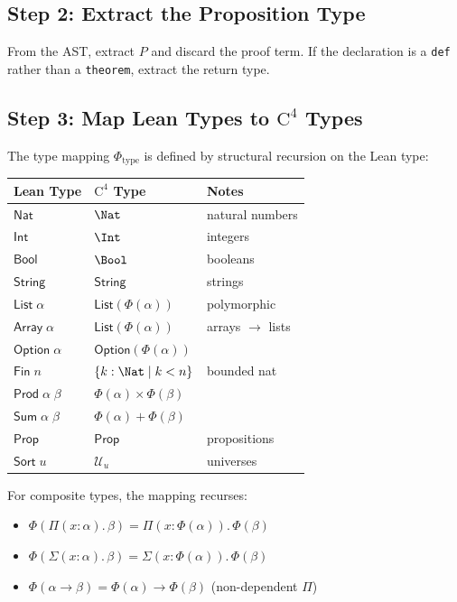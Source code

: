 \subsection{Step 2: Extract the Proposition Type}

From the AST, extract $P$ and discard the proof term.  If the
declaration is a \texttt{def} rather than a \texttt{theorem}, extract
the return type.

\subsection{Step 3: Map Lean Types to $\mathrm{C}^4$ Types}

The type mapping $\Phi_\mathrm{type}$ is defined by structural recursion
on the Lean type:

\begin{center}
\begin{tabular}{lll}
\toprule
\textbf{Lean Type} & \textbf{$\mathrm{C}^4$ Type} & \textbf{Notes} \\
\midrule
$\mathsf{Nat}$ & $\Nat$ & natural numbers \\
$\mathsf{Int}$ & $\Int$ & integers \\
$\mathsf{Bool}$ & $\Bool$ & booleans \\
$\mathsf{String}$ & $\mathsf{String}$ & strings \\
$\mathsf{List}\;\alpha$ & $\mathsf{List}(\Phi(\alpha))$ & polymorphic \\
$\mathsf{Array}\;\alpha$ & $\mathsf{List}(\Phi(\alpha))$ & arrays $\to$ lists \\
$\mathsf{Option}\;\alpha$ & $\mathsf{Option}(\Phi(\alpha))$ & \\
$\mathsf{Fin}\;n$ & $\{k : \Nat \mid k < n\}$ & bounded nat \\
$\mathsf{Prod}\;\alpha\;\beta$ & $\Phi(\alpha) \times \Phi(\beta)$ & \\
$\mathsf{Sum}\;\alpha\;\beta$ & $\Phi(\alpha) + \Phi(\beta)$ & \\
$\mathsf{Prop}$ & $\mathsf{Prop}$ & propositions \\
$\mathsf{Sort}\;u$ & $\mathcal{U}_u$ & universes \\
\bottomrule
\end{tabular}
\end{center}

For composite types, the mapping recurses:
\begin{itemize}
\item $\Phi(\Pi(x:\alpha).\,\beta) = \Pi(x:\Phi(\alpha)).\,\Phi(\beta)$
\item $\Phi(\Sigma(x:\alpha).\,\beta) = \Sigma(x:\Phi(\alpha)).\,\Phi(\beta)$
\item $\Phi(\alpha \to \beta) = \Phi(\alpha) \to \Phi(\beta)$
  \quad (non-dependent $\Pi$)
\end{itemize}

